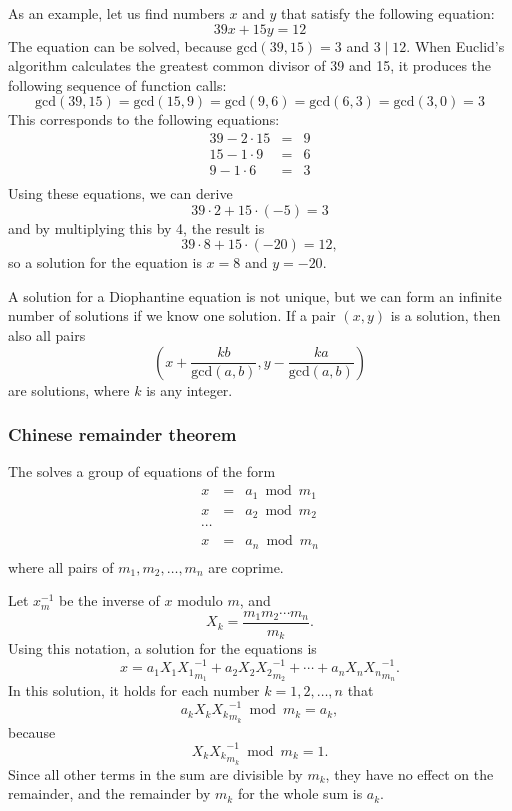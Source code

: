 As an example, let us find numbers $x$ and $y$
that satisfy the following equation:
\[
39x + 15y = 12
\]
The equation can be solved, because
$\textrm{gcd}(39,15)=3$ and $3 \mid 12$.
When Euclid's algorithm calculates the
greatest common divisor of 39 and 15,
it produces the following sequence of function calls:
\[
\textrm{gcd}(39,15) = \textrm{gcd}(15,9)
= \textrm{gcd}(9,6) = \textrm{gcd}(6,3)
= \textrm{gcd}(3,0) = 3 \]
This corresponds to the following equations:
\[
\begin{array}{lcl}
39 - 2 \cdot 15 & = & 9 \\
15 - 1 \cdot 9 & = & 6 \\
9 - 1 \cdot 6 & = & 3 \\
\end{array}
\]
Using these equations, we can derive
\[
39 \cdot 2 + 15 \cdot (-5) = 3
\]
and by multiplying this by 4, the result is
\[
39 \cdot 8 + 15 \cdot (-20) = 12,
\]
so a solution for the equation is
$x=8$ and $y=-20$.

A solution for a Diophantine equation is not unique,
but we can form an infinite number of solutions
if we know one solution.
If a pair $(x,y)$ is a solution, then also all pairs
\[(x+\frac{kb}{\textrm{gcd}(a,b)},y-\frac{ka}{\textrm{gcd}(a,b)})\]
are solutions, where $k$ is any integer.

\subsubsection{Chinese remainder theorem}


The  solves
a group of equations of the form
\[
\begin{array}{lcl}
x & = & a_1 \bmod m_1 \\
x & = & a_2 \bmod m_2 \\
\cdots \\
x & = & a_n \bmod m_n \\
\end{array}
\]
where all pairs of $m_1,m_2,\ldots,m_n$ are coprime.

Let $x^{-1}_m$ be the inverse of $x$ modulo $m$, and
\[ X_k = \frac{m_1 m_2 \cdots m_n}{m_k}.\]
Using this notation, a solution for the equations is
\[x = a_1 X_1 {X_1}^{-1}_{m_1} + a_2 X_2 {X_2}^{-1}_{m_2} + \cdots + a_n X_n {X_n}^{-1}_{m_n}.\]
In this solution, it holds for each number
$k=1,2,\ldots,n$ that
\[a_k X_k {X_k}^{-1}_{m_k} \bmod m_k = a_k,\]
because
\[X_k {X_k}^{-1}_{m_k} \bmod m_k = 1.\]
Since all other terms in the sum are divisible by $m_k$,
they have no effect on the remainder,
and the remainder by $m_k$ for the whole sum is $a_k$.

